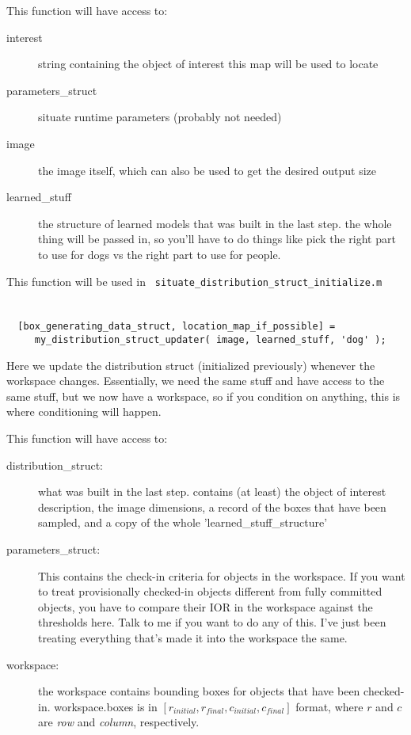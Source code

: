 \documentclass[11pt]{article}
\begin{document}
		This function will have access to:
		\begin{description}
\item[		interest ]
			string containing the object of interest this map will be used to locate
\item[		parameters\_struct ]
			situate runtime parameters (probably not needed)
\item[		image ]
			the image itself, which can also be used to get the desired output size
\item[		learned\_stuff ]
			the structure of learned models that was built in the last step. the whole thing will be passed in, so you'll have to do things like pick the right part to use for dogs vs the right part to use for people.
			\end{description}


	This function will be used in \verb| situate_distribution_struct_initialize.m |




\section{}

\verb|  [box_generating_data_struct, location_map_if_possible] = | \\
\verb|     my_distribution_struct_updater( image, learned_stuff, 'dog' ); |
	
	Here we update the distribution struct (initialized previously) whenever the workspace changes. Essentially, we need the same stuff and have access to the same stuff, but we now have a workspace, so if you condition on anything, this is where conditioning will happen.

		This function will have access to:
	\begin{description}
\item[		distribution\_struct: ]
			what was built in the last step. contains (at least) the object of interest description, the image dimensions, a record of the boxes that have been sampled, and a copy of the whole 'learned\_stuff\_structure'
\item[		parameters\_struct: ]
			This contains the check-in criteria for objects in the workspace. If you want to treat provisionally checked-in objects different from fully committed objects, you have to compare their IOR in the workspace against the thresholds here. Talk to me if you want to do any of this. I've just been treating everything that's made it into the workspace the same.
\item[		workspace: ]
			the workspace contains bounding boxes for objects that have been checked-in. 
			workspace.boxes is in $[r_{initial}, r_{final}, c_{initial}, c_{final}]$ format, where $r$ and $c$ are \emph{row} and \emph{column}, respectively.
		\end{description}
		
\end{document}
